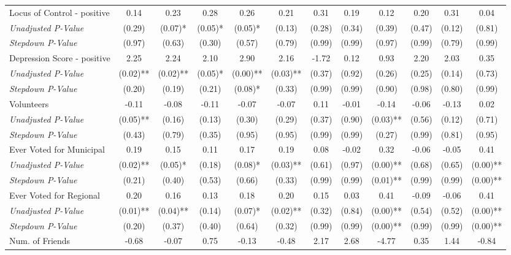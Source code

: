 \begin{tabular}{l c c c c c c c c c c c}
Locus of Control - positive & 0.14 & 0.23 & 0.28 & 0.26 & 0.21 & 0.31 & 0.19 & 0.12 & 0.20 & 0.31 & 0.04 \\
\quad \textit{Unadjusted P-Value} & (0.29) & (0.07)* & (0.05)* & (0.05)* & (0.13) & (0.28) & (0.34) & (0.39) & (0.47) & (0.12) & (0.81) \\
\quad \textit{Stepdown P-Value} & (0.97) & (0.63) & (0.30) & (0.57) & (0.79) & (0.99) & (0.99) & (0.97) & (0.99) & (0.79) & (0.99) \\
Depression Score - positive & 2.25 & 2.24 & 2.10 & 2.90 & 2.16 & -1.72 & 0.12 & 0.93 & 2.20 & 2.03 & 0.35 \\
\quad \textit{Unadjusted P-Value} & (0.02)** & (0.02)** & (0.05)* & (0.00)** & (0.03)** & (0.37) & (0.92) & (0.26) & (0.25) & (0.14) & (0.73) \\
\quad \textit{Stepdown P-Value} & (0.20) & (0.19) & (0.21) & (0.08)* & (0.33) & (0.99) & (0.99) & (0.90) & (0.98) & (0.80) & (0.99) \\
Volunteers & -0.11 & -0.08 & -0.11 & -0.07 & -0.07 & 0.11 & -0.01 & -0.14 & -0.06 & -0.13 & 0.02 \\
\quad \textit{Unadjusted P-Value} & (0.05)** & (0.16) & (0.13) & (0.30) & (0.29) & (0.37) & (0.90) & (0.03)** & (0.56) & (0.12) & (0.71) \\
\quad \textit{Stepdown P-Value} & (0.43) & (0.79) & (0.35) & (0.95) & (0.95) & (0.99) & (0.99) & (0.27) & (0.99) & (0.81) & (0.95) \\
Ever Voted for Municipal & 0.19 & 0.15 & 0.11 & 0.17 & 0.19 & 0.08 & -0.02 & 0.32 & -0.06 & -0.05 & 0.41 \\
\quad \textit{Unadjusted P-Value} & (0.02)** & (0.05)* & (0.18) & (0.08)* & (0.03)** & (0.61) & (0.97) & (0.00)** & (0.68) & (0.65) & (0.00)** \\
\quad \textit{Stepdown P-Value} & (0.21) & (0.40) & (0.53) & (0.66) & (0.33) & (0.99) & (0.99) & (0.01)** & (0.99) & (0.99) & (0.00)** \\
Ever Voted for Regional & 0.20 & 0.16 & 0.13 & 0.18 & 0.20 & 0.15 & 0.03 & 0.41 & -0.09 & -0.06 & 0.41 \\
\quad \textit{Unadjusted P-Value} & (0.01)** & (0.04)** & (0.14) & (0.07)* & (0.02)** & (0.32) & (0.84) & (0.00)** & (0.54) & (0.52) & (0.00)** \\
\quad \textit{Stepdown P-Value} & (0.20) & (0.37) & (0.40) & (0.64) & (0.32) & (0.99) & (0.99) & (0.00)** & (0.99) & (0.99) & (0.00)** \\
Num. of Friends & -0.68 & -0.07 & 0.75 & -0.13 & -0.48 & 2.17 & 2.68 & -4.77 & 0.35 & 1.44 & -0.84 \\

\end{tabular}
